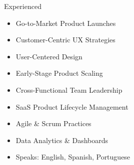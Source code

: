 %
Experienced
  \begin{itemize}
    \setlength\itemsep{-0.3em}
\item Go-to-Market Product Launches
\item Customer-Centric UX Strategies
\item User-Centered Design
\item Early-Stage Product Scaling
\item Cross-Functional Team Leadership
\item SaaS Product Lifecycle Management
\item Agile \& Scrum Practices
\item Data Analytics \& Dashboards
\item Speaks: English, Spanish, Portuguese
    \end{itemize}
\\
